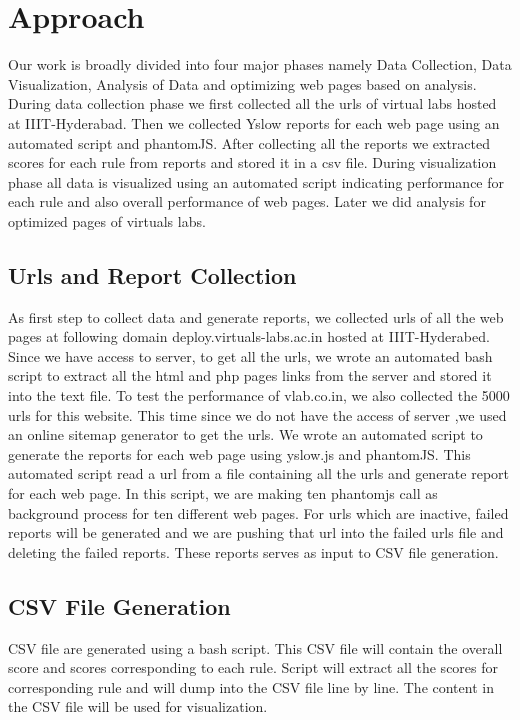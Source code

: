 \documentclass[conference]{IEEEtran}
\begin{document}
\section{Approach}\label{sec-4}
Our work is broadly divided into four major phases namely Data Collection, Data
Visualization, Analysis of Data and optimizing web pages based on analysis.
During data collection phase we first collected all the urls of virtual labs
hosted at IIIT-Hyderabad. Then we collected Yslow reports for each web page
using an automated script and phantomJS. After collecting all the reports we
extracted scores for each rule from reports and stored it in a csv file. During
visualization phase all data is visualized using an automated script indicating
performance for each rule and also overall performance of web pages. Later we
did analysis for optimized pages of virtuals labs.

\subsection{Urls and Report Collection}\label{sec-4.1}
As first step to collect data and generate reports, we
collected urls of all the web pages at following domain deploy.virtuals-labs.ac.in hosted at
IIIT-Hyderabed. Since we have access to server, to get all the urls, we wrote an
automated bash script to extract all the html and php pages links from the
server and stored it into the text file.
To test the performance of vlab.co.in, we also collected the 5000 urls for this
website. This time since we do not have the access of server ,we used an online
sitemap generator to get the urls.
We wrote an automated script to generate the reports for each web page using
yslow.js and phantomJS. This automated script read a url from a file containing
all the urls and generate report for each web page. In this script, we are making
ten phantomjs call as background process for ten different web pages. For urls which are inactive, failed reports will
be generated and we are pushing that url into the failed urls file and deleting
the failed reports. These reports serves as input to CSV file generation.

\subsection{CSV File Generation}\label{sec-4.2}
CSV file are generated using a bash script. This CSV file will contain the overall
score and scores corresponding to each rule. Script will extract all the scores
for corresponding rule and will dump into the CSV file line by line. The
content in the CSV file will be used for visualization.
\end{document}
